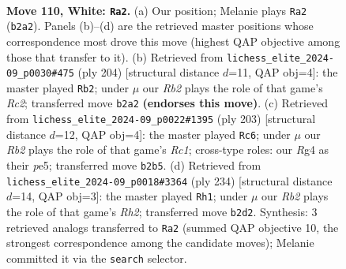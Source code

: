 \documentclass[11pt]{article}
\begin{document}
\clearpage

\begin{figure}[p]\centering
\begin{subfigure}{0.46\textwidth}\centering
\resizebox{\linewidth}{!}{%
\newchessgame
\chessboard[
  setfen={8/3k4/4p3/4P3/5PR1/8/1R3K2/7r w - - 5 110},
  showmover=false,
  pgfstyle=straightmove, color=movearrow, markmove={b2-a2}
]}
\caption{}
\end{subfigure}\hfill
\begin{subfigure}{0.46\textwidth}\centering
\resizebox{\linewidth}{!}{%
\newchessgame
\chessboard[
  setfen={8/6k1/8/7p/7P/6P1/2R3K1/r7 w - - 51 103},
  showmover=false,
  pgfstyle=straightmove, color=movearrow, markmove={c2-b2}
]}
\caption{}
\end{subfigure}
\\[4pt]
\begin{subfigure}{0.46\textwidth}\centering
\resizebox{\linewidth}{!}{%
\newchessgame
\chessboard[
  setfen={2r2k2/R5p1/7p/4PK1P/8/8/8/8 b - - 23 102},
  showmover=false,
  pgfstyle=straightmove, color=movearrow, markmove={c8-c6}
]}
\caption{}
\end{subfigure}\hfill
\begin{subfigure}{0.46\textwidth}\centering
\resizebox{\linewidth}{!}{%
\newchessgame
\chessboard[
  setfen={8/7k/6p1/7p/5r1P/8/4K2R/8 w - - 96 118},
  showmover=false,
  pgfstyle=straightmove, color=movearrow, markmove={h2-h1}
]}
\caption{}
\end{subfigure}
\caption{\textbf{Move 110, White: \texttt{Ra2}.} (a) Our position; Melanie plays \texttt{Ra2} (\texttt{b2a2}). Panels (b)--(d) are the retrieved master positions whose correspondence most drove this move (highest QAP objective among those that transfer to it). (b) Retrieved from \texttt{lichess\_elite\_2024-09\_p0030\#475} (ply 204) [structural distance $d$=11, QAP obj=4]: the master played \texttt{Rb2}; under $\mu$ our \emph{Rb2} plays the role of that game's \emph{Rc2}; transferred move \texttt{b2a2} \textbf{(endorses this move)}. (c) Retrieved from \texttt{lichess\_elite\_2024-09\_p0022\#1395} (ply 203) [structural distance $d$=12, QAP obj=4]: the master played \texttt{Rc6}; under $\mu$ our \emph{Rb2} plays the role of that game's \emph{Rc1}; cross-type roles: our \emph{R}g4 as their \emph{p}e5; transferred move \texttt{b2b5}. (d) Retrieved from \texttt{lichess\_elite\_2024-09\_p0018\#3364} (ply 234) [structural distance $d$=14, QAP obj=3]: the master played \texttt{Rh1}; under $\mu$ our \emph{Rb2} plays the role of that game's \emph{Rh2}; transferred move \texttt{b2d2}. Synthesis: 3 retrieved analogs transferred to \texttt{Ra2} (summed QAP objective 10, the strongest correspondence among the candidate moves); Melanie committed it via the \texttt{search} selector.}
\label{fig:thought-m218}
\end{figure}
\end{document}
